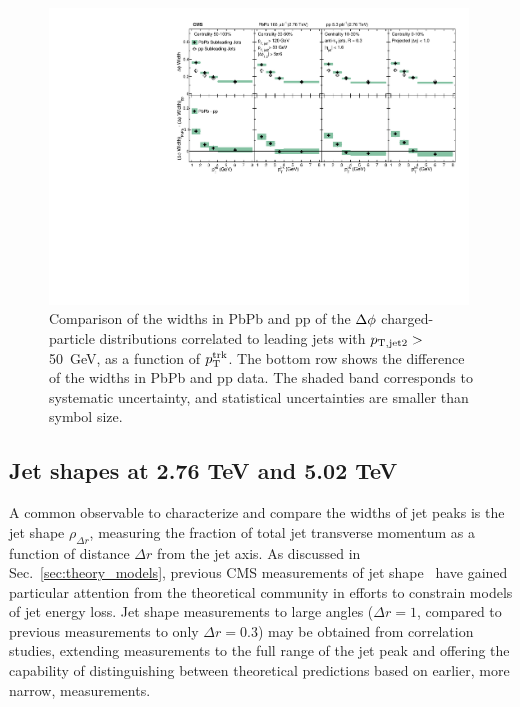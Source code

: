 \begin{figure}[hbtp]
\begin{center}
\includegraphics[width=0.99\textwidth]{figures/Results/Width_Phi_SubLeading.pdf}
\caption[Subleading jet $\Delta\phi$ correlation widths as a function of $p_{\rm T}^{\rm trk}$ at 2.76 TeV]{Comparison of the widths in PbPb and pp of the $\protect\Delta\phi$ charged-particle distributions correlated to leading jets with $p_{\rm T, jet2}>$ 50~GeV, as a function of $p_{\rm T}^{\rm trk}$.  The bottom row shows the difference of the widths in PbPb and pp data.  The shaded band corresponds to systematic uncertainty, and statistical uncertainties are smaller than symbol size.}
\label{fig:Width_phi_sub}
\end{center}
\end{figure}



\clearpage


\subsection{Jet shapes at 2.76 TeV and 5.02 TeV}
\label{sec:jet_shapes}

A common observable to characterize and compare the widths of jet peaks is the jet shape $\rho_{\Delta r}$, measuring the fraction of total jet transverse momentum as a function of distance $\Delta r$ from the jet axis.  As discussed in Sec.~\ref{sec:theory_models}, previous CMS measurements of jet shape~\cite{Chatrchyan:2013kwa} have gained particular attention from the theoretical community in efforts to constrain models of jet energy loss.  Jet shape measurements to large angles ($\Delta r = 1$, compared to previous measurements to only $\Delta r = 0.3$) may be obtained from correlation studies, extending measurements to the full range of the jet peak and offering the capability of distinguishing between theoretical predictions based on earlier, more narrow, measurements.  

